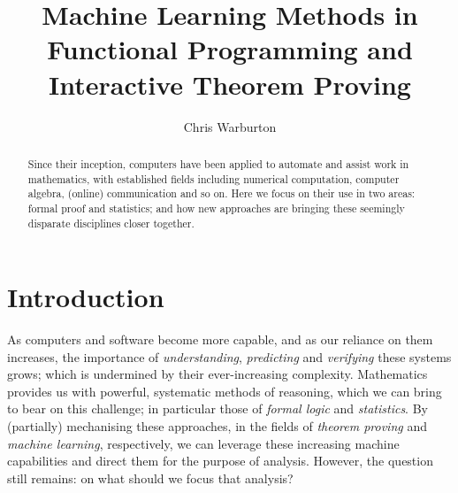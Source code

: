 \documentclass[]{article}
\begin{document}
\pagestyle{headings}  %

\title{Machine Learning Methods in Functional Programming and Interactive Theorem Proving}

\author{Chris Warburton}


\maketitle              %

\begin{abstract}
Since their inception, computers have been applied to automate and assist work in mathematics, with established fields including numerical computation, computer algebra, (online) communication and so on. Here we focus on their use in two areas: formal proof and statistics; and how new approaches are bringing these seemingly disparate disciplines closer together.
\end{abstract}

\section{Introduction}

As computers and software become more capable, and as our reliance on them increases, the importance of \emph{understanding}, \emph{predicting} and \emph{verifying} these systems grows; which is undermined by their ever-increasing complexity. Mathematics provides us with powerful, systematic methods of reasoning, which we can bring to bear on this challenge; in particular those of \emph{formal logic} and \emph{statistics}. By (partially) mechanising these approaches, in the fields of \emph{theorem proving} and \emph{machine learning}, respectively, we can leverage these increasing machine capabilities and direct them for the purpose of analysis. However, the question still remains: on what should we focus that analysis?
\end{document}
